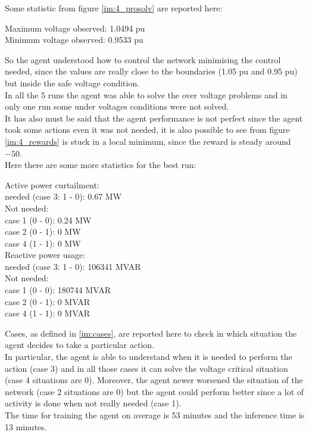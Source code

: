 \noindent Some statistic from figure \ref{im:4_prosolv} are  reported here:

\begin{algorithm}[ht]
    \STATE Maximum voltage observed: 1.0494 \gls{pu} \\
    \STATE Minimum voltage observed: 0.9533 \gls{pu}
\end{algorithm}
\noindent So the agent understood how to control the network minimising the control needed, since the values are really close to the boundaries (1.05 \gls{pu} and 0.95 \gls{pu}) but inside the safe voltage condition.\\

In all the 5 runs the agent was able to solve the over voltage problems and in only one run some under voltages conditions were not solved.\\
It has also must be said that the agent performance is not perfect since the agent took some actions even it was not needed, it is also possible to see from figure \ref{im:4_rewards} is stuck in a local minimum, since the reward is steady around $-50$. \\

\noindent Here there are some more statistics for the best run:\\

\begin{algorithm}[h]
    \STATE Active power curtailment:\\
    \STATE needed (case 3: 1 - 0): 0.67 MW\\
    \STATE Not needed:\\
    \STATE case 1 (0 - 0): 0.24 MW\\
    \STATE case 2 (0 - 1): 0 MW\\
    \STATE case 4 (1 - 1): 0 MW\\
    
    \STATE Reactive power usage:\\
    \STATE needed (case 3: 1 - 0): 106341 MVAR\\
    \STATE Not needed:\\
    \STATE case 1 (0 - 0): 180744 MVAR\\
    \STATE case 2 (0 - 1): 0 MVAR\\
    \STATE case 4 (1 - 1): 0 MVAR
\label{alg:agentsucks}
\end{algorithm}
\noindent Cases, as defined in \ref{im:cases}, are reported here to check in which situation the agent decides to take a particular action.\\
In particular, the agent is able to understand when it is needed to perform the action (case 3) and in all those cases it can solve the voltage critical situation (case 4 situations are 0). Moreover, the agent newer worsened the situation of the network (case 2 situations are 0) but the agent could perform better since a lot of activity is done when not really needed (case 1).\\

The time for training the agent on average is 53 minutes and the inference time is 13 minutes.